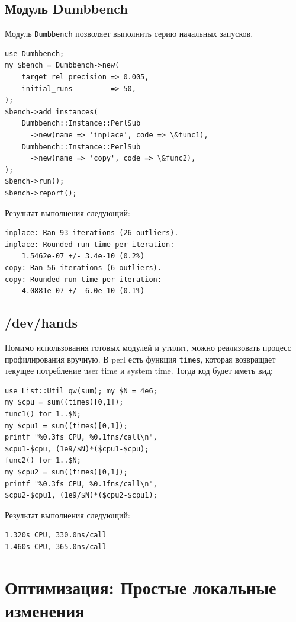 \subsection{Модуль Dumbbench}
Модуль \verb|Dumbbench| позволяет выполнить серию начальных запусков.
\begin{verbatim}
use Dumbbench;
my $bench = Dumbbench->new(
    target_rel_precision => 0.005,
    initial_runs         => 50,
);
$bench->add_instances(
    Dumbbench::Instance::PerlSub
      ->new(name => 'inplace', code => \&func1),
    Dumbbench::Instance::PerlSub
      ->new(name => 'copy', code => \&func2),
);
$bench->run();
$bench->report();
\end{verbatim}
Результат выполнения следующий:
\begin{verbatim}
inplace: Ran 93 iterations (26 outliers).
inplace: Rounded run time per iteration:
    1.5462e-07 +/- 3.4e-10 (0.2%)
copy: Ran 56 iterations (6 outliers).
copy: Rounded run time per iteration:
    4.0881e-07 +/- 6.0e-10 (0.1%)
\end{verbatim}

\subsection{/dev/hands}
Помимо использования готовых модулей и утилит, можно реализовать процесс профилирования вручную. В perl есть функция \verb|times|, которая возвращает текущее потребление user time и system time. Тогда код будет иметь вид:
\begin{verbatim}
use List::Util qw(sum); my $N = 4e6;
my $cpu = sum((times)[0,1]);
func1() for 1..$N;
my $cpu1 = sum((times)[0,1]);
printf "%0.3fs CPU, %0.1fns/call\n",
$cpu1-$cpu, (1e9/$N)*($cpu1-$cpu);
func2() for 1..$N;
my $cpu2 = sum((times)[0,1]);
printf "%0.3fs CPU, %0.1fns/call\n",
$cpu2-$cpu1, (1e9/$N)*($cpu2-$cpu1);
\end{verbatim}
Результат выполнения следующий:
\begin{verbatim}
1.320s CPU, 330.0ns/call
1.460s CPU, 365.0ns/call
\end{verbatim}

\section{Оптимизация: Простые локальные изменения}

